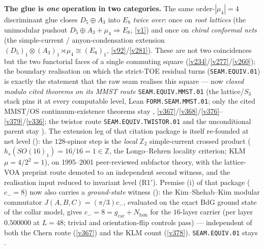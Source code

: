 \documentclass[11pt,a4paper]{article}
\newcommand{\gcar}{g_{\mathrm{car}}}
\newcommand{\Nfam}{N_{\mathrm{fam}}}
\newcommand{\Z}{\mathbb{Z}}
\theoremstyle{definition}
\begin{document}
\par\smallskip\noindent\textbf{The glue is \emph{one} operation in two categories.} The same
order-$|\mu_4|{=}4$ discriminant glue closes $D_5\oplus A_3$ into $E_8$ \emph{twice over}: once on
\emph{root lattices} (the unimodular pushout $D_5\oplus A_3+\mu_4\Rightarrow E_8$, \vref{v1}) and once on
\emph{chiral conformal nets} (the simple-current / anyon-condensation extension
$(D_5)_1\otimes(A_3)_1\rtimes\mu_4\cong(E_8)_1$, \vref{v92}/\vref{v281}). These are not two coincidences but
the two functorial faces of a single commuting square (\vref{v234}/\vref{v277}/\vref{v260}); the boundary
realisation on which the strict-TOE residual turns (\texttt{SEAM.EQUIV.01}) is exactly the statement that the
raw seam realises this square --- now \emph{closed modulo cited theorems on its MMST route}
\texttt{SEAM.EQUIV.MMST.01} (the lattice/$S_3$ stack pins it at
every computable level, Lean \texttt{FORM.SEAM.MMST.01}; only the cited MMST/OS continuum-existence theorems stay
\mO, \vref{v367}/\vref{v368}/\vref{v376}--\vref{v379}/\vref{v336}; the twistor route
\texttt{SEAM.EQUIV.TWISTOR.01} and the unconditional parent stay \mO). The extension leg of that citation package is
itself re-founded at net level (): the $128$-spinor step is the
\emph{local} $\Z_2$ simple-current crossed product ($h_s(SO(16)_1)=16/16=1\in\Z$, the Longo--Rehren locality
criterion; KLM $\mu=4/2^2=1$), on 1995--2001 peer-reviewed subfactor theory, with the lattice-VOA preprint route
demoted to an independent second witness, and the realisation input reduced to invariant level (R1$'$).
Premise (i) of that package ($c_-{=}8$) now also carries a \emph{ground-state} witness
(): the Kim--Shehab--Kim modular commutator
$J(A,B,C)=(\pi/3)c_-$, evaluated on the exact BdG ground state of the collar model, gives $c_-=8=\gcar+\Nfam$
for the $16$-layer carrier (per layer $0.500000$ at $L{=}48$; trivial and orientation-flip controls pass) ---
independent of both the Chern route (\vref{v367}) and the KLM count (\vref{v378}).
\texttt{SEAM.EQUIV.01} stays \mO.

\TFPTdoublepushout
\end{document}
